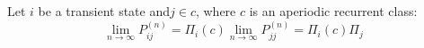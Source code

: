 \begin{theorem}
Let $i$ be a transient state and$j \in c$, where $c$ is an aperiodic recurrent class:
$$\lim_{n\to\infty} P_{ij}^{(n)} = \Pi_i(c) \lim_{n\to\infty} P_{jj}^{(n)} = \Pi_i(c) \Pi_j$$
\end{theorem}












